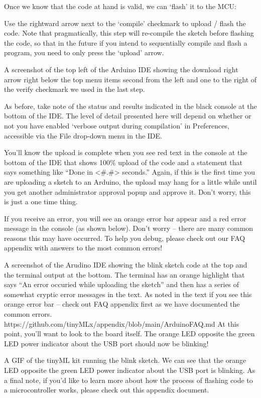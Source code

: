 Once we know that the code at hand is valid, we can ‘flash’ it to the MCU:

Use the rightward arrow next to the ‘compile’ checkmark to upload / flash the code.
Note that pragmatically, this step will re-compile the sketch before flashing the code, so that in the future if you intend to sequentially compile and flash a program, you need to only press the ‘upload’ arrow.

A screenshot of the top left of the Arduino IDE showing the download right arrow right below the top menu items second from the left and one to the right of the verify checkmark we used in the last step.

As before, take note of the status and results indicated in the black console at the bottom of the IDE. The level of detail presented here will depend on whether or not you have enabled ‘verbose output during compilation’ in Preferences, accessible via the File drop-down menu in the IDE.

You’ll know the upload is complete when you see red text in the console at the bottom of the IDE that shows 100\% upload of the code and a statement that says something like “Done in <\#.\#> seconds.” Again, if this is the first time you are uploading a sketch to an Arduino, the upload may hang for a little while until you get another administrator approval popup and approve it. Don’t worry, this is just a one time thing.

If you receive an error, you will see an orange error bar appear and a red error message in the console (as shown below). Don’t worry -- there are many common reasons this may have occurred. To help you debug, please check out our FAQ appendix with answers to the most common errors!

A screenshot of the Arudino IDE showing the blink sketch code at the top and the terminal output at the bottom. The terminal has an orange highlight that says “An error occuried while uploading the sketch” and then has a series of somewhat cryptic error messages in the text. As noted in the text if you see this orange error bar -- check out FAQ appendix first as we have documented the common errors. https://github.com/tinyMLx/appendix/blob/main/ArduinoFAQ.md
At this point, you’ll want to look to the board itself. The orange LED opposite the green LED power indicator about the USB port should now be blinking!

A GIF of the tinyML kit running the blink sketch. We can see that the orange LED opposite the green LED power indicator about the USB port is blinking.
As a final note, if you’d like to learn more about how the process of flashing code to a microcontroller works, please check out this appendix document.

